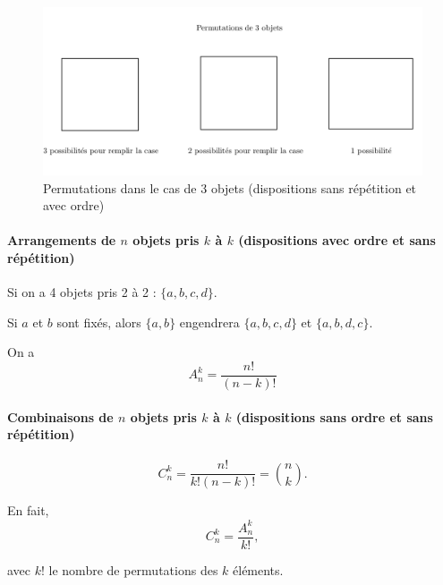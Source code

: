 \documentclass[french]{book}
\theoremstyle{definition}
\theoremstyle{remark}
\begin{document}
\begin{figure}[h!]
  \centering
  \includegraphics[scale=0.3]{figures/perm3.png}
  \caption{Permutations dans le cas de 3 objets (dispositions sans répétition et avec ordre)}
  \label{}
\end{figure}

\paragraph{Arrangements de $n$ objets pris $k$ à $k$ (dispositions avec ordre et sans répétition)} %

Si on a 4 objets pris 2 à 2 : $\{ a,b,c,d \} $.

Si $a$ et $b$ sont fixés, alors $\{ a,b \} $ engendrera $\{ a,b,c,d \} $ et $\{ a,b,d,c \} $.

On a $$A _{n} ^{k} = \frac{n!}{(n-k)!}$$

\paragraph{Combinaisons de $n$ objets pris $k$ à $k$ (dispositions sans ordre et sans répétition)}

\begin{equation}
  C _{n} ^{k} = \frac{n!}{k!(n-k)!} = \binom{n}{k}.
\end{equation}

En fait,
\begin{equation*}
  C _{n} ^{k} = \frac{A _{n} ^{k}}{k!},
\end{equation*}

avec $k!$ le nombre de permutations des $k$ éléments.

\end{document}
